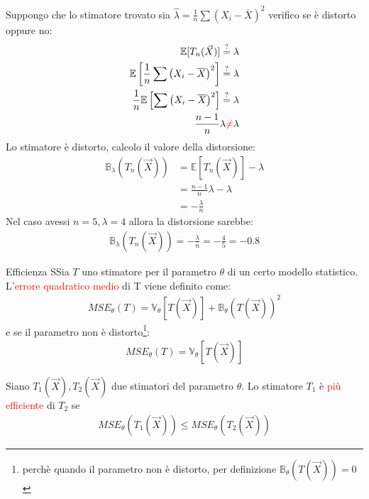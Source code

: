 \documentclass{article}  %
\theoremstyle{definition}
\begin{document}
\begin{esempio}
	Suppongo che lo stimatore trovato sia $\hat{\lambda}=\frac{1}{n}\sum \left(X_i - \overline{X}\right)^2$ verifico se è distorto oppure no:
	\begin{align*}
		\mathbb{E}[T_n(\vec{X})] \overset{?}{=} \lambda                                                  \\
		\mathbb{E}\left[\frac{1}{n}\sum \left(X_i - \overline{X}\right)^2\right] \overset{?}{=} \lambda  \\
		\frac{1}{n} \mathbb{E}\left[\sum \left(X_i - \overline{X}\right)^2\right] \overset{?}{=} \lambda \\
		\frac{n-1}{n}\lambda \textcolor{red}{\neq} \lambda
	\end{align*}
	Lo stimatore è distorto, calcolo il valore della distorsione:
	\begin{align*}
		\mathbb{B}_{\lambda}(T_n(\vec{X})) & = \mathbb{E}[T_n(\vec{X})] - \lambda \\ &=  \frac{n-1}{n}\lambda - \lambda \\
		                                   & = - \frac{\lambda}{n}
	\end{align*}
	Nel caso avessi $n=5, \lambda=4$ allora la distorsione sarebbe:
	\begin{align*}
		\mathbb{B}_{\lambda}(T_n(\vec{X})) = - \frac{\lambda}{n} =- \frac{4}{5} = -0.8
	\end{align*}
\end{esempio}
\begin{theorem}{Efficienza}
	SSia $T$ uno stimatore per il parametro $\theta$ di un certo modello statistico. L'\textcolor{red}{errore quadratico medio} di T viene definito come:
	\begin{align*}
		MSE_{\theta}(T) = \mathbb{V}_{\theta}[T(\vec{X})] + \mathbb{B}_{\theta}(T(\vec{X}))^2
	\end{align*}
	e se il parametro non è distorto\footnote{perchè quando il parametro non è distorto, per definizione $\mathbb{B}_{\theta}(T(\vec{X}))=0$}:
	\begin{align*}
		MSE_{\theta}(T) = \mathbb{V}_{\theta}[T(\vec{X})]
	\end{align*}
\end{theorem}
Siano $T_1(\vec{X}), T_2(\vec{X})$ due stimatori del parametro $\theta$. Lo stimatore $T_1$ è \textcolor{red}{più efficiente} di $T_2$ se
\begin{align*}
	MSE_{\theta}(T_1(\vec{X})) \leq MSE_{\theta}(T_2(\vec{X}))
\end{align*}
\end{document}
